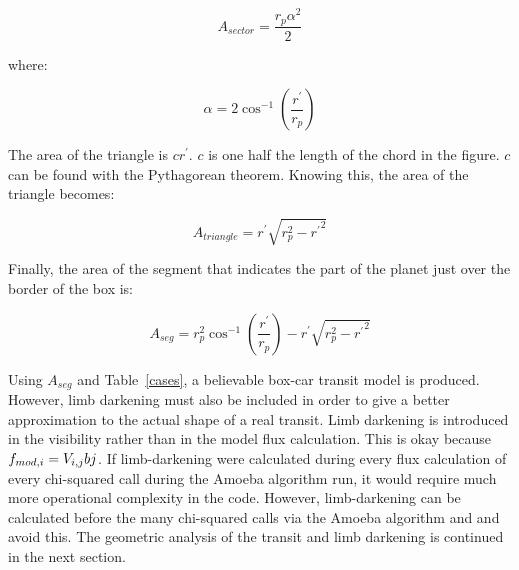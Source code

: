 \begin{equation}
	A_{sector} = \frac{r_p \alpha^2}{2}
\end{equation}

where:

\begin{equation}
	\alpha = 2 \cos^{-1}\left(\frac{r^{\prime}}{r_p}\right)
\end{equation}

The area of the triangle is $cr^{\prime}$. $c$ is one half the length of the chord in the figure. $c$ can be found with the Pythagorean theorem. Knowing this, the area of the triangle becomes: 

\begin{equation}
	A_{triangle} = r^{\prime}\sqrt{r_p^2 - {r^{\prime}}^2}
\end{equation}

Finally, the area of the segment that indicates the part of the planet just over the border of the box is:

\begin{equation}
	A_{seg} = r_p^2 \cos^{-1}\left(\frac{r^{\prime}}{r_p}\right) - r^{\prime} \sqrt{r_p^2 - {r^{\prime}}^2}
\end{equation}

Using $A_{seg} $ and Table~\ref{cases}, a believable box-car transit model is produced. However, limb darkening must also be included in order to give a better approximation to the actual shape of a real transit. Limb darkening is introduced in the visibility rather than in the model flux calculation. This is okay because $\mbox{$f_{mod,i}$} = V_{i,j} b{j}$. If limb-darkening were calculated during every flux calculation of every chi-squared call during the Amoeba algorithm run, it would require much more operational complexity in the code. However, limb-darkening can be calculated before the many chi-squared calls via the Amoeba algorithm and and avoid this.  The geometric analysis of the transit and limb darkening is continued in the next section.

